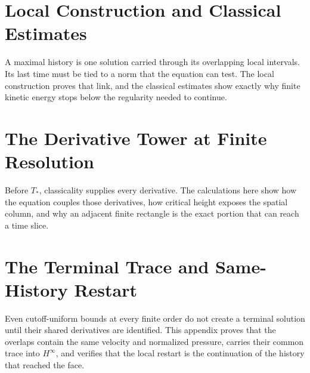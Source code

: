 \section{Local Construction and Classical Estimates}\label{app:LocalConstructionAndClassicalEstimates}

A maximal history is one solution carried through its overlapping local
intervals.  Its last time must be tied to a norm that the equation can test.
The local construction proves that link, and the classical estimates show
exactly why finite kinetic energy stops below the regularity needed to continue.




\section{The Derivative Tower at Finite Resolution}\label{app:DerivativeAndFiniteRecordCalculus}\label{sec:FromCriticalHeightToCompatibleFiniteViews}

Before \(T_*\), classicality supplies every derivative.  The calculations here
show how the equation couples those derivatives, how critical height exposes
the spatial column, and why an adjacent finite rectangle is the exact portion
that can reach a time slice.








\section{The Terminal Trace and Same-History Restart}\label{app:CompatibleTerminalAssembly}\label{sec:TheCompatibleIntersectionAtTheTerminalTime}

Even cutoff-uniform bounds at every finite order do not create a terminal
solution until their shared derivatives are identified.  This appendix proves
that the overlaps contain the same velocity and normalized pressure, carries
their common trace into \(H^\infty\), and verifies that the local restart is the
continuation of the history that reached the face.






